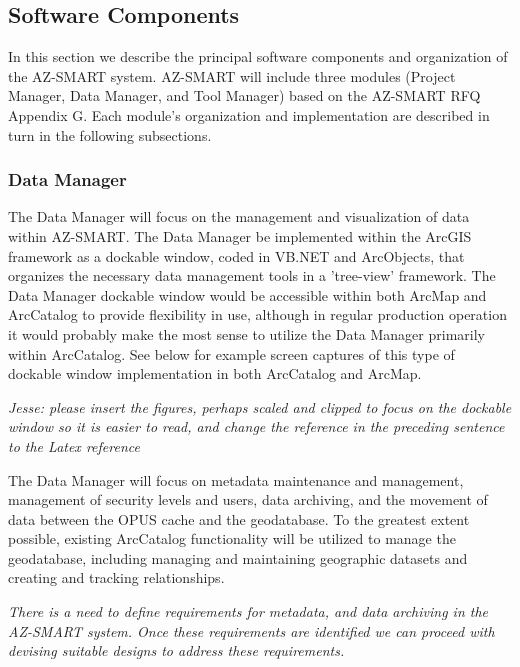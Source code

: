 \subsection{Software Components}

In this section we describe the principal software components and organization of the AZ-SMART system.  AZ-SMART will include three modules (Project Manager, Data Manager, and Tool Manager) based on the AZ-SMART RFQ Appendix G. Each module's organization and implementation are described in turn in the following subsections.



\subsubsection{Data Manager}

The Data Manager will focus on the management and visualization of data within AZ-SMART.  The Data Manager be implemented within the ArcGIS framework as a dockable window, coded in VB.NET and ArcObjects, that organizes the necessary data management tools in a 'tree-view' framework.  The Data Manager dockable window would be accessible within both ArcMap and ArcCatalog to provide flexibility in use, although in regular production operation it would probably make the most sense to utilize the Data Manager primarily within ArcCatalog.  See below for example screen captures of this type of dockable window implementation in both ArcCatalog and ArcMap. 

\emph{Jesse: please insert the figures, perhaps scaled and clipped to focus on the dockable window so it is easier to read, and change the reference in the preceding sentence to the Latex reference}

The Data Manager will focus on metadata maintenance and management, management of security levels and users, data archiving, and the movement of data between the OPUS cache and the geodatabase.  To the greatest extent possible, existing ArcCatalog functionality will be utilized to manage the geodatabase, including managing and maintaining geographic datasets and creating and tracking relationships.

\emph{There is a need to define requirements for metadata, and data archiving in the AZ-SMART system.  Once these requirements are identified we can proceed with devising suitable designs to address these requirements.}

